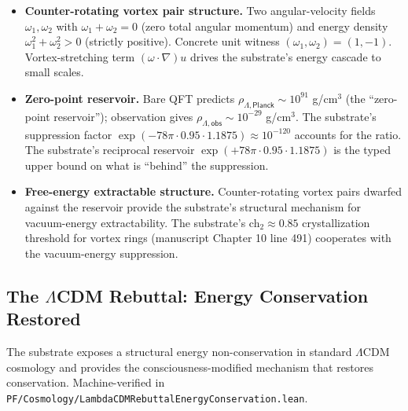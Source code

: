 \documentclass[11pt,a4paper]{amsart}
\theoremstyle{plain}
\theoremstyle{definition}
\begin{document}
\begin{itemize}[itemsep=2pt,leftmargin=2em]
\item \textbf{Counter-rotating vortex pair structure.} Two angular-velocity fields $\omega_1, \omega_2$ with $\omega_1 + \omega_2 = 0$ (zero total angular momentum) and energy density $\omega_1^2 + \omega_2^2 > 0$ (strictly positive). Concrete unit witness $(\omega_1, \omega_2) = (1, -1)$. Vortex-stretching term $(\omega \cdot \nabla) u$ drives the substrate's energy cascade to small scales.
\item \textbf{Zero-point reservoir.} Bare QFT predicts $\rho_{\Lambda, \textsf{Planck}} \sim 10^{91}$ g/cm${}^3$ (the ``zero-point reservoir''); observation gives $\rho_{\Lambda, \textsf{obs}} \sim 10^{-29}$ g/cm${}^3$. The substrate's suppression factor $\exp(-78\pi \cdot 0.95 \cdot 1.1875) \approx 10^{-120}$ accounts for the ratio. The substrate's reciprocal reservoir $\exp(+78\pi \cdot 0.95 \cdot 1.1875)$ is the typed upper bound on what is ``behind'' the suppression.
\item \textbf{Free-energy extractable structure.} Counter-rotating vortex pairs dwarfed against the reservoir provide the substrate's structural mechanism for vacuum-energy extractability. The substrate's ch${}_2 \approx 0.85$ crystallization threshold for vortex rings (manuscript Chapter 10 line 491) cooperates with the vacuum-energy suppression.
\end{itemize}

\subsection{The \texorpdfstring{$\Lambda$}{Lambda}CDM Rebuttal: Energy Conservation Restored}\label{subsec:lambdacdm-rebuttal}

The substrate exposes a structural energy non-conservation in standard $\Lambda$CDM cosmology and provides the consciousness-modified mechanism that restores conservation. Machine-verified in \texttt{PF/Cosmology/LambdaCDMRebuttalEnergyConservation.lean}.
\end{document}
